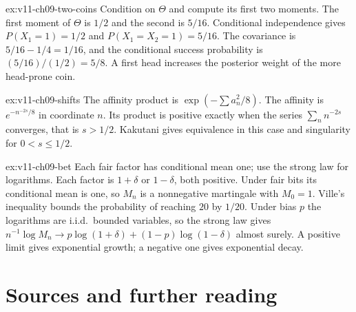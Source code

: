 \begin{solution}{ex:v11-ch09-two-coins}
\idea Condition on $\Theta$ and compute its first two moments.
\writeup The first moment of $\Theta$ is $1/2$ and the second is $5/16$. Conditional independence gives $P(X_1=1)=1/2$ and $P(X_1=X_2=1)=5/16$. The covariance is $5/16-1/4=1/16$, and the conditional success probability is $(5/16)/(1/2)=5/8$. A first head increases the posterior weight of the more head-prone coin.
\end{solution}

\begin{solution}{ex:v11-ch09-shifts}
\idea The affinity product is $\exp(-\sum a_n^2/8)$.
\writeup The affinity is $e^{-n^{-2s}/8}$ in coordinate $n$. Its product is positive exactly when the series $\sum_n n^{-2s}$ converges, that is $s>1/2$. Kakutani gives equivalence in this case and singularity for $0<s\le1/2$.
\end{solution}

\begin{solution}{ex:v11-ch09-bet}
\idea Each fair factor has conditional mean one; use the strong law for logarithms.
\writeup Each factor is $1+\delta$ or $1-\delta$, both positive. Under fair bits its conditional mean is one, so $M_n$ is a nonnegative martingale with $M_0=1$. Ville's inequality bounds the probability of reaching $20$ by $1/20$. Under bias $p$ the logarithms are i.i.d.\ bounded variables, so the strong law gives $n^{-1}\log M_n\to p\log(1+\delta)+(1-p)\log(1-\delta)$ almost surely. A positive limit gives exponential growth; a negative one gives exponential decay.
\end{solution}

\section*{Sources and further reading}

